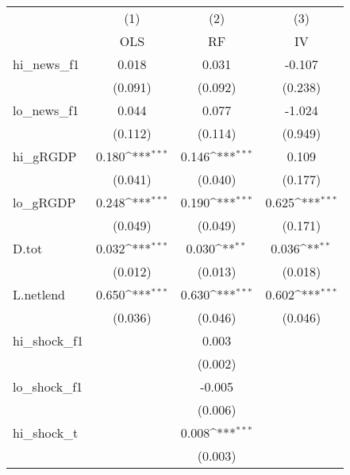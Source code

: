 {
\def\sym#1{\ifmmode^{#1}\else\(^{#1}\)\fi}
\begin{tabular}{l*{3}{c}}
\toprule
            &\multicolumn{1}{c}{(1)}&\multicolumn{1}{c}{(2)}&\multicolumn{1}{c}{(3)}\\
            &\multicolumn{1}{c}{OLS}&\multicolumn{1}{c}{RF}&\multicolumn{1}{c}{IV}\\
\midrule
hi\_news\_f1  &       0.018         &       0.031         &      -0.107         \\
            &     (0.091)         &     (0.092)         &     (0.238)         \\
\addlinespace
lo\_news\_f1  &       0.044         &       0.077         &      -1.024         \\
            &     (0.112)         &     (0.114)         &     (0.949)         \\
\addlinespace
hi\_gRGDP    &       0.180\sym{***}&       0.146\sym{***}&       0.109         \\
            &     (0.041)         &     (0.040)         &     (0.177)         \\
\addlinespace
lo\_gRGDP    &       0.248\sym{***}&       0.190\sym{***}&       0.625\sym{***}\\
            &     (0.049)         &     (0.049)         &     (0.171)         \\
\addlinespace
D.tot       &       0.032\sym{***}&       0.030\sym{**} &       0.036\sym{**} \\
            &     (0.012)         &     (0.013)         &     (0.018)         \\
\addlinespace
L.netlend   &       0.650\sym{***}&       0.630\sym{***}&       0.602\sym{***}\\
            &     (0.036)         &     (0.046)         &     (0.046)         \\
\addlinespace
hi\_shock\_f1 &                     &       0.003         &                     \\
            &                     &     (0.002)         &                     \\
\addlinespace
lo\_shock\_f1 &                     &      -0.005         &                     \\
            &                     &     (0.006)         &                     \\
\addlinespace
hi\_shock\_t  &                     &       0.008\sym{***}&                     \\
            &                     &     (0.003)         &                     \\

\end{tabular}}
